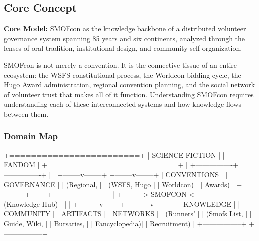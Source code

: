 \documentclass[11pt,letterpaper]{article}
\begin{document}
\subsection{Core Concept}

\begin{quotebox}
\textbf{Core Model:} SMOFcon as the knowledge backbone of a distributed volunteer governance system spanning 85 years and six continents, analyzed through the lenses of oral tradition, institutional design, and community self-organization.
\end{quotebox}

SMOFcon is not merely a convention. It is the connective tissue of an entire ecosystem: the WSFS constitutional process, the Worldcon bidding cycle, the Hugo Award administration, regional convention planning, and the social network of volunteer trust that makes all of it function. Understanding SMOFcon requires understanding each of these interconnected systems and how knowledge flows between them.

\subsubsection{Domain Map}

\begin{asciibox}
                    +========================+
                    |    SCIENCE FICTION      |
                    |      FANDOM             |
                    +========================+
                              |
             +----------------+----------------+
             |                                 |
    +--------v--------+              +--------v--------+
    |   CONVENTIONS   |              |    GOVERNANCE   |
    |   (Regional,    |              |    (WSFS, Hugo  |
    |    Worldcon)    |              |     Awards)     |
    +---------+-------+              +--------+--------+
              |                               |
              +--------->  SMOFCON  <---------+
              |        (Knowledge Hub)        |
              |                               |
    +---------v-------+              +--------v--------+
    |  KNOWLEDGE      |              |  COMMUNITY      |
    |  ARTIFACTS      |              |  NETWORKS       |
    |  (Runners'      |              |  (Smofs List,   |
    |   Guide, Wiki,  |              |   Bursaries,    |
    |   Fancyclopedia)|              |   Recruitment)  |
    +-----------------+              +-----------------+
\end{asciibox}
\end{document}
